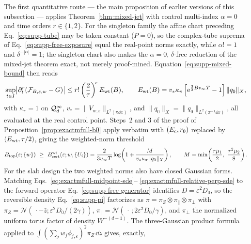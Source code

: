 \begin{remark}
\label{rem:exactmfull-b0-baseline}
The first quantitative route --- the main proposition of earlier versions
of this subsection --- applies Theorem~\ref{thm:mixed-jet} with control
multi-index \(\alpha=0\) and time orders \(r\in\{1,2\}\).  For the
singleton family the affine chart preceding Eq.~\eqref{eq:supp-tube} may be
taken constant (\(P=0\)), so the complex-tube suprema of
Eq.~\eqref{eq:supp-free-exposure} equal the real-point norms exactly, while
\(\alpha!=1\) and \(\delta^{-|\alpha|}=1\); the singleton chart also makes
the \(\alpha=0\), \(\delta\)-free reduction of the mixed-jet theorem
exact, not merely proof-mined.  Equation~\eqref{eq:supp-mixed-bound} then
reads
\begin{equation}
 \sup_{t\in I}
 \bigl|\partial_t^r(\mathcal F_{B,\varepsilon,w}-G)\bigr|
 \le r!\left(\frac2\tau\right)^{\!r}E_{\rm wt}(B),
 \qquad
 E_{\rm wt}(B)=v_*\kappa_\pi
 \left[\mathrm e^{\frac32Bv_\infty T}-1\right]\|q_0\|_X,
 \label{eq:exactmfull-b0-baseline-jet}
\end{equation}
with \(\kappa_\pi=1\) on \(\mathcal Q_d^{\infty}\),
\(v_*=\|V_{w,\varepsilon}\|_{L^2(\pi\dd x)}\), and
\(\|q_0\|_X=\|q_0\|_{L^2(\pi^{-1}\dd x)}\), all evaluated at the real
control point.  Steps~2 and 3 of the proof of
Proposition~\ref{prop:exactmfull-b0} apply verbatim with
\((E_{\rm c},r_0)\) replaced by \((E_{\rm wt},\tau/2)\), giving the
weighted-norm threshold
\begin{equation}
 B_{\rm top}(\varepsilon;\{w\})\ \ge\
 B_{\rm cert}^{\rm wt}(\varepsilon;w,\{U_i\})
 =\frac{2}{3v_\infty T}
  \log\!\left(1+\frac{M}{v_*\kappa_\pi\|q_0\|_X}\right),
 \qquad
 M=\min\!\left(\frac{\tau\mu_1}{2},\ \frac{\tau^2\mu_2}{8}\right).
 \label{eq:exactmfull-b0-baseline-threshold}
\end{equation}
For the slab design the two weighted norms also have closed Gaussian
forms.  Matching Eqs.~\eqref{eq:exactmfull-midpoint-sde}--%
\eqref{eq:exactmfull-relative-perp-sde} to the forward operator
Eq.~\eqref{eq:supp-free-generator} identifies \(D=\varepsilon^2D_0\), so
the reversible density Eq.~\eqref{eq:supp-pi} factorizes as
\(\pi=\pi_Z\otimes\pi_\parallel\otimes\pi_\perp\) with
\(\pi_Z=\mathcal N(\,\cdot-\bar z;\varepsilon^2D_0/(2\gamma))\),
\(\pi_\parallel=\mathcal N(\,\cdot\,;2\varepsilon^2D_0/\gamma)\), and
\(\pi_\perp\) the normalized uniform torus factor of density
\(W^{-(d-1)}\).  The three-Gaussian product formula applied to
\(\int(\sum_jw_j\phi_{j,\varepsilon})^2\pi_Z\,\dd z\) gives, exactly,

\end{remark}
